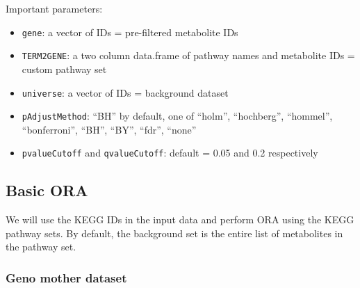\documentclass[
  24px,
  letterpaper,
  DIV=11,
  numbers=noendperiod]{scrartcl}
\newenvironment{Shaded}{\begin{snugshade}}{\end{snugshade}}
\newcommand{\AttributeTok}[1]{\textcolor[rgb]{0.40,0.45,0.13}{#1}}
\newcommand{\FunctionTok}[1]{\textcolor[rgb]{0.28,0.35,0.67}{#1}}
\newcommand{\NormalTok}[1]{\textcolor[rgb]{0.00,0.23,0.31}{#1}}
\newcommand{\OtherTok}[1]{\textcolor[rgb]{0.00,0.23,0.31}{#1}}
\newcommand{\SpecialCharTok}[1]{\textcolor[rgb]{0.37,0.37,0.37}{#1}}
\begin{document}
Important parameters:

\begin{itemize}
\item
  \texttt{gene}: a vector of IDs = pre-filtered metabolite IDs
\item
  \texttt{TERM2GENE}: a two column data.frame of pathway names and
  metabolite IDs = custom pathway set
\item
  \texttt{universe}: a vector of IDs = background dataset
\item
  \texttt{pAdjustMethod}: ``BH'' by default, one of ``holm'',
  ``hochberg'', ``hommel'', ``bonferroni'', ``BH'', ``BY'', ``fdr'',
  ``none''
\item
  \texttt{pvalueCutoff} and \texttt{qvalueCutoff}: default = 0.05 and
  0.2 respectively
\end{itemize}

\hypertarget{basic-ora}{%
\subsection{Basic ORA}\label{basic-ora}}

We will use the KEGG IDs in the input data and perform ORA using the
KEGG pathway sets. By default, the background set is the entire list of
metabolites in the pathway set.

\hypertarget{geno-mother-dataset}{%
\subsubsection{Geno mother dataset}\label{geno-mother-dataset}}

\begin{Shaded}
\end{Shaded}
\end{document}
